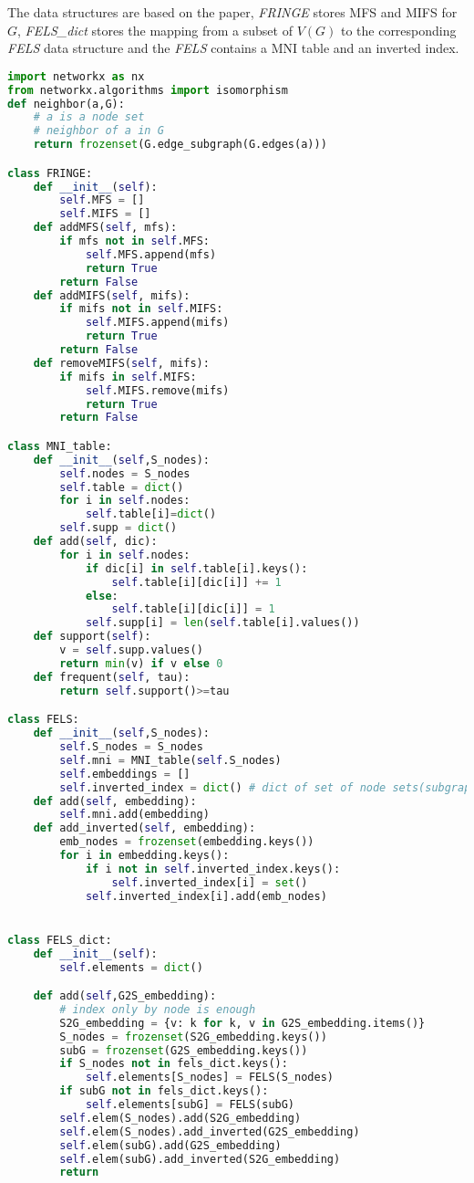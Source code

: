 \documentclass[a4paper, 12pt]{report}
\newcounter{i}
\begin{document}
The data structures are based on the paper, \emph{FRINGE} stores MFS and MIFS for $G$, \emph{FELS\_dict} stores the mapping from a subset of $V(G)$ to the corresponding \emph{FELS} data structure and the \emph{FELS} contains a MNI table and an inverted index.
\begin{lstlisting}[language=python, frame=single]
import networkx as nx
from networkx.algorithms import isomorphism
def neighbor(a,G):
    # a is a node set
    # neighbor of a in G
    return frozenset(G.edge_subgraph(G.edges(a)))

class FRINGE:
    def __init__(self):
        self.MFS = []
        self.MIFS = []
    def addMFS(self, mfs):
        if mfs not in self.MFS:
            self.MFS.append(mfs)
            return True
        return False
    def addMIFS(self, mifs):
        if mifs not in self.MIFS:
            self.MIFS.append(mifs)
            return True
        return False
    def removeMIFS(self, mifs):
        if mifs in self.MIFS:
            self.MIFS.remove(mifs)
            return True
        return False

class MNI_table:
    def __init__(self,S_nodes):
        self.nodes = S_nodes
        self.table = dict()
        for i in self.nodes:
            self.table[i]=dict()
        self.supp = dict()
    def add(self, dic):
        for i in self.nodes:
            if dic[i] in self.table[i].keys():
                self.table[i][dic[i]] += 1
            else:
                self.table[i][dic[i]] = 1
            self.supp[i] = len(self.table[i].values())
    def support(self):
        v = self.supp.values()
        return min(v) if v else 0
    def frequent(self, tau):
        return self.support()>=tau

class FELS:
    def __init__(self,S_nodes):
        self.S_nodes = S_nodes
        self.mni = MNI_table(self.S_nodes)
        self.embeddings = []
        self.inverted_index = dict() # dict of set of node sets(subgraph)
    def add(self, embedding):
        self.mni.add(embedding)
    def add_inverted(self, embedding):
        emb_nodes = frozenset(embedding.keys())
        for i in embedding.keys():
            if i not in self.inverted_index.keys():
                self.inverted_index[i] = set()
            self.inverted_index[i].add(emb_nodes)


class FELS_dict:
    def __init__(self):
        self.elements = dict()

    def add(self,G2S_embedding):
        # index only by node is enough
        S2G_embedding = {v: k for k, v in G2S_embedding.items()}
        S_nodes = frozenset(S2G_embedding.keys())
        subG = frozenset(G2S_embedding.keys())
        if S_nodes not in fels_dict.keys():
            self.elements[S_nodes] = FELS(S_nodes)
        if subG not in fels_dict.keys():
            self.elements[subG] = FELS(subG)
        self.elem(S_nodes).add(S2G_embedding)
        self.elem(S_nodes).add_inverted(G2S_embedding)
        self.elem(subG).add(G2S_embedding)
        self.elem(subG).add_inverted(S2G_embedding)
        return


\end{lstlisting}
\end{document}
